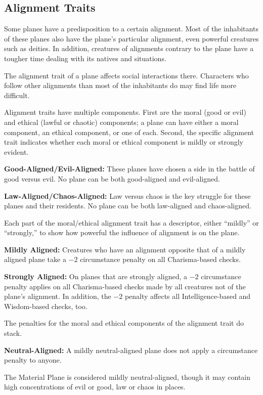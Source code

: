 \subsection{Alignment Traits}
Some planes have a predisposition to a certain alignment. Most of the inhabitants of these planes also have the plane's particular alignment, even powerful creatures such as deities. In addition, creatures of alignments contrary to the plane have a tougher time dealing with its natives and situations.

The alignment trait of a plane affects social interactions there. Characters who follow other alignments than most of the inhabitants do may find life more difficult.

Alignment traits have multiple components. First are the moral (good or evil) and ethical (lawful or chaotic) components; a plane can have either a moral component, an ethical component, or one of each. Second, the specific alignment trait indicates whether each moral or ethical component is mildly or strongly evident.

\textbf{Good-Aligned/Evil-Aligned:} These planes have chosen a side in the battle of good versus evil. No plane can be both good-aligned and evil-aligned.

\textbf{Law-Aligned/Chaos-Aligned:} Law versus chaos is the key struggle for these planes and their residents. No plane can be both law-aligned and chaos-aligned.

Each part of the moral/ethical alignment trait has a descriptor, either ``mildly'' or ``strongly,'' to show how powerful the influence of alignment is on the plane.

\textbf{Mildly Aligned:} Creatures who have an alignment opposite that of a mildly aligned plane take a $-2$ circumstance penalty on all Charisma-based checks.

\textbf{Strongly Aligned:} On planes that are strongly aligned, a $-2$ circumstance penalty applies on all Charisma-based checks made by all creatures not of the plane's alignment. In addition, the $-2$ penalty affects all Intelligence-based and Wisdom-based checks, too.

The penalties for the moral and ethical components of the alignment trait do stack.

\textbf{Neutral-Aligned:} A mildly neutral-aligned plane does not apply a circumstance penalty to anyone.

The Material Plane is considered mildly neutral-aligned, though it may contain high concentrations of evil or good, law or chaos in places.

